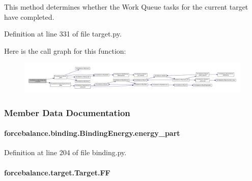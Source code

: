 This method determines whether the Work Queue tasks for the current target have completed. 



Definition at line 331 of file target.\-py.



Here is the call graph for this function\-:\nopagebreak
\begin{figure}[H]
\begin{center}
\leavevmode
\includegraphics[width=350pt]{classforcebalance_1_1target_1_1Target_af6099ec09486213869dba2491bd8ea04_cgraph}
\end{center}
\end{figure}




\subsubsection{Member Data Documentation}
\hypertarget{classforcebalance_1_1binding_1_1BindingEnergy_a4efa69b8f81d993b58851650d9b5ef89}{
\paragraph[{energy\-\_\-part}]{\setlength{\rightskip}{0pt plus 5cm}forcebalance.\-binding.\-Binding\-Energy.\-energy\-\_\-part\hspace{0.3cm}{\ttfamily [inherited]}}}\label{classforcebalance_1_1binding_1_1BindingEnergy_a4efa69b8f81d993b58851650d9b5ef89}


Definition at line 204 of file binding.\-py.

\hypertarget{classforcebalance_1_1target_1_1Target_a38a37919783141ea37fdcf8b00ce0aaf}{
\paragraph[{F\-F}]{\setlength{\rightskip}{0pt plus 5cm}forcebalance.\-target.\-Target.\-F\-F\hspace{0.3cm}{\ttfamily [inherited]}}}\label{classforcebalance_1_1target_1_1Target_a38a37919783141ea37fdcf8b00ce0aaf}


